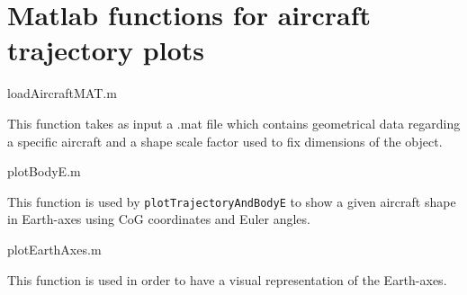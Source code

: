 \documentclass[[12pt,twoside]{book}
\begin{document}
%
%
\chapter%
   [Matlab functions for aircraft trajectory plots]%
   {Matlab functions for aircraft trajectory plots}
\label{chap:Appendix:Matlab:Trajectory}

%
    {loadAircraftMAT.m}
    
    This function takes as input a .mat file which contains geometrical data regarding a specific aircraft and a shape scale factor used to fix dimensions of the object.
    
%
    {plotBodyE.m}
  
  This function is used by \lstinline[basicstyle=\ttfamily]{plotTrajectoryAndBodyE} to show a given aircraft shape in Earth-axes using CoG coordinates and Euler angles.  
  
    {plotEarthAxes.m}
  
  This function is used in order to have a visual representation of the Earth-axes.
\end{document}
